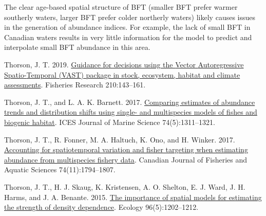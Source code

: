 \documentclass[
]{article}
\newlength{\cslhangindent}
\newlength{\cslentryspacingunit} %
\newenvironment{CSLReferences}[2] %
 {%
  \setlength{\parindent}{0pt}
  \ifodd #1
  \let\oldpar\par
  \def\par{\hangindent=\cslhangindent\oldpar}
  \fi
  \setlength{\parskip}{#2\cslentryspacingunit}
 }%
 {}
\begin{document}
The clear age-based spatial structure of BFT (smaller BFT prefer warmer southerly waters, larger BFT prefer colder northerly waters) likely causes issues in the generation of abundance indices. For example, the lack of small BFT in Canadian waters results in very little information for the model to predict and interpolate small BFT abundance in this area.

\hypertarget{refs}{}
\begin{CSLReferences}{1}{0}
\leavevmode{}%
Thorson, J. T. 2019. \href{https://doi.org/10.1016/j.fishres.2018.10.013}{Guidance for decisions using the {Vector} {Autoregressive} {Spatio}-{Temporal} ({VAST}) package in stock, ecosystem, habitat and climate assessments}. Fisheries Research 210:143--161.

\leavevmode{}%
Thorson, J. T., and L. A. K. Barnett. 2017. \href{https://doi.org/10.1093/icesjms/fsw193}{Comparing estimates of abundance trends and distribution shifts using single- and multispecies models of fishes and biogenic habitat}. ICES Journal of Marine Science 74(5):1311--1321.

\leavevmode{}%
Thorson, J. T., R. Fonner, M. A. Haltuch, K. Ono, and H. Winker. 2017. \href{https://doi.org/10.1139/cjfas-2015-0598}{Accounting for spatiotemporal variation and fisher targeting when estimating abundance from multispecies fishery data}. Canadian Journal of Fisheries and Aquatic Sciences 74(11):1794--1807.

\leavevmode{}%
Thorson, J. T., H. J. Skaug, K. Kristensen, A. O. Shelton, E. J. Ward, J. H. Harms, and J. A. Benante. 2015. \href{https://doi.org/10.1890/14-0739.1}{The importance of spatial models for estimating the strength of density dependence}. Ecology 96(5):1202--1212.

\end{CSLReferences}
\end{document}
